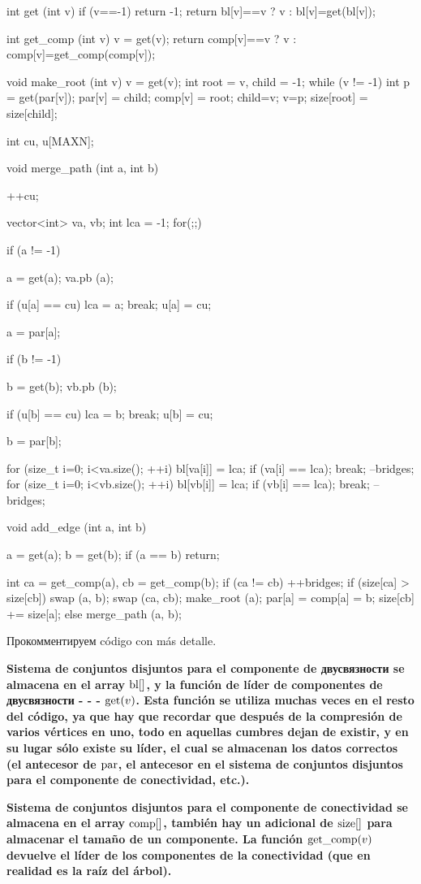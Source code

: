 int get (int v) {
if (v==-1) return -1;
return bl[v]==v ? v : bl[v]=get(bl[v]);
}

int get_comp (int v) {
v = get(v);
return comp[v]==v ? v : comp[v]=get_comp(comp[v]);
}

void make_root (int v) {
v = get(v);
int root = v,
child = -1;
while (v != -1) {
int p = get(par[v]);
par[v] = child;
comp[v] = root;
child=v; v=p;
}
size[root] = size[child];
}


int cu, u[MAXN];

void merge_path (int a, int b) {
++cu;

vector<int> va, vb;
int lca = -1;
for(;;) {
if (a != -1) {
a = get(a);
va.pb (a);

if (u[a] == cu) {
lca = a;
break;
}
u[a] = cu;

a = par[a];
}

if (b != -1) {
b = get(b);
vb.pb (b);

if (u[b] == cu) {
lca = b;
break;
}
u[b] = cu;

b = par[b];
}
}

for (size_t i=0; i<va.size(); ++i) {
bl[va[i]] = lca;
if (va[i] == lca); break;
--bridges;
}
for (size_t i=0; i<vb.size(); ++i) {
bl[vb[i]] = lca;
if (vb[i] == lca); break;
--bridges;
}
}


void add_edge (int a, int b) {
a = get(a); b = get(b);
if (a == b) return;

int ca = get_comp(a),
cb = get_comp(b);
if (ca != cb) {
++bridges;
if (size[ca] > size[cb]) {
swap (a, b);
swap (ca, cb);
}
make_root (a);
par[a] = comp[a] = b;
size[cb] += size[a];
}
else
merge_path (a, b);
}
\endcode


Прокомментируем código con más detalle.

\bf{Sistema de conjuntos disjuntos para el componente de двусвязности} se almacena en el array ${\rm bl}[]$, y la función de líder de componentes de двусвязности - - - ${\rm get}(v)$. Esta función se utiliza muchas veces en el resto del código, ya que hay que recordar que después de la compresión de varios vértices en uno, todo en aquellas cumbres dejan de existir, y en su lugar sólo existe su líder, el cual se almacenan los datos correctos (el antecesor de ${\rm par}$, el antecesor en el sistema de conjuntos disjuntos para el componente de conectividad, etc.).

\bf{Sistema de conjuntos disjuntos para el componente de conectividad} se almacena en el array ${\rm comp}[]$, también hay un adicional de ${\rm size}[]$ para almacenar el tamaño de un componente. La función ${\rm get\_comp}(v)$ devuelve el líder de los componentes de la conectividad (que en realidad es la raíz del árbol).

